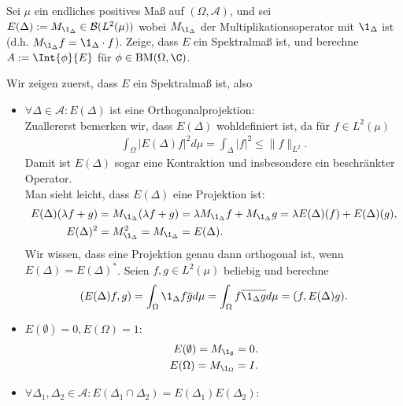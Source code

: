 \begin{exercise}[34/2]

Sei $\mu$ ein endliches positives Maß auf $(\Omega, \mathcal{A})$,
und sei $E(\Delta) := M_{\1_\Delta} \in \mathcal{B}(L^2(\mu))$ wobei $M_{\1_\Delta}$
der Multiplikationsoperator mit $\1_\Delta$ ist (d.h. $M_{\1_\Delta} f = \1_\Delta \cdot f$).
Zeige, dass $E$ ein Spektralmaß ist, und berechne $A := \Int{\phi}{E}$ für $\phi \in \mathrm{BM}(\Omega, \C)$.

\end{exercise}

\begin{solution}
Wir zeigen zuerst, dass $E$ ein Spektralmaß ist, also
\begin{itemize}
  \item $\forall \Delta \in \mathcal{A}: E(\Delta)$ ist eine Orthogonalprojektion: \\
  Zuallererst bemerken wir, dass $E(\Delta)$ wohldefiniert ist, da für $f \in L^2(\mu)$
  \begin{align*}
    \int_\Omega |E(\Delta)f|^2 d\mu = \int_\Delta |f|^2 \leq \|f\|_{L^2}.
  \end{align*}
  Damit ist $E(\Delta)$ sogar eine Kontraktion und insbesondere ein beschränkter Operator. \\
  Man sieht leicht, dass $E(\Delta)$ eine Projektion ist:
  \begin{align*}
    E(\Delta)(\lambda f + g) &= M_{\1_\Delta}(\lambda f + g) = \lambda M_{\1_\Delta}f
    + M_{\1_\Delta}g = \lambda E(\Delta)(f) + E(\Delta)(g), \\
    E(\Delta)^2 &= M_{\1_\Delta}^2 = M_{\1_\Delta} = E(\Delta).
  \end{align*}
  Wir wissen, dass eine Projektion genau dann orthogonal ist, wenn $E(\Delta) = E(\Delta)^*$.
  Seien $f,g \in L^2(\mu)$ beliebig und berechne
  \begin{align*}
    (E(\Delta)f,g) = \int_\Omega \1_\Delta f\overline{g} d\mu
    = \int_\Omega  f\overline{ \1_\Delta g} d\mu = (f,E(\Delta)g).
  \end{align*}
  \item $E(\emptyset) = 0, E(\Omega) = 1$:
  \begin{align*}
    E(\emptyset) = M_{\1_{\emptyset}} = 0. \\
    E(\Omega) = M_{\1_{\Omega}} = I. \\
  \end{align*}
  \item $\forall \Delta_1,\Delta_2 \in \mathcal{A}:
  E(\Delta_1 \cap \Delta_2) = E(\Delta_1)E(\Delta_2)$: \\

\end{itemize}
\end{solution}
